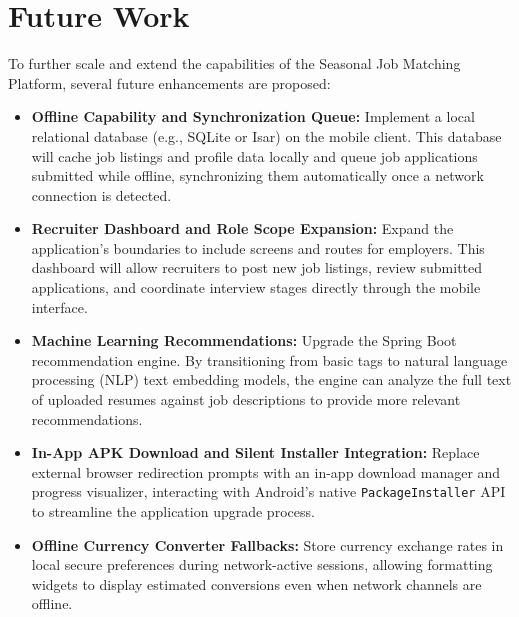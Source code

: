 \section{Future Work}
To further scale and extend the capabilities of the Seasonal Job Matching Platform, several future enhancements are proposed:
\begin{itemize}
    \item \textbf{Offline Capability and Synchronization Queue:} Implement a local relational database (e.g., SQLite or Isar) on the mobile client. This database will cache job listings and profile data locally and queue job applications submitted while offline, synchronizing them automatically once a network connection is detected.
    \item \textbf{Recruiter Dashboard and Role Scope Expansion:} Expand the application's boundaries to include screens and routes for employers. This dashboard will allow recruiters to post new job listings, review submitted applications, and coordinate interview stages directly through the mobile interface.
    \item \textbf{Machine Learning Recommendations:} Upgrade the Spring Boot recommendation engine. By transitioning from basic tags to natural language processing (NLP) text embedding models, the engine can analyze the full text of uploaded resumes against job descriptions to provide more relevant recommendations.
    \item \textbf{In-App APK Download and Silent Installer Integration:} Replace external browser redirection prompts with an in-app download manager and progress visualizer, interacting with Android's native \texttt{PackageInstaller} API to streamline the application upgrade process.
    \item \textbf{Offline Currency Converter Fallbacks:} Store currency exchange rates in local secure preferences during network-active sessions, allowing formatting widgets to display estimated conversions even when network channels are offline.
\end{itemize}
